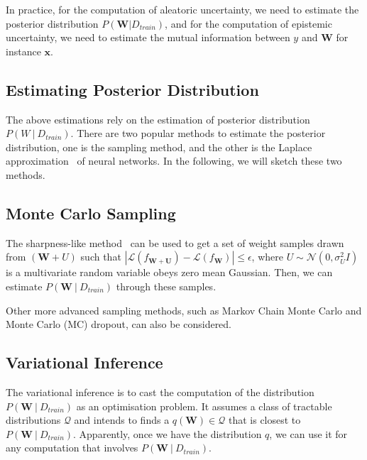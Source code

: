 In practice, for the computation of aleatoric uncertainty, we need to estimate the posterior distribution $P(\textbf{W}|D_{train})$, and for the computation of epistemic uncertainty, we need to estimate the mutual information between $y$ and $\textbf{W}$ for instance $\textbf{x}$. 

\subsection{Estimating Posterior Distribution}\label{sec:estimationgposteirordistribution}

The above estimations rely on the estimation of posterior distribution $P(W~|~D_{train})$. There are two popular methods to estimate the posterior distribution, one is the sampling method, and the other is the Laplace approximation~\cite{botev2017practical,ritter2018scalable} of neural networks. In the following, we will sketch these two methods.   





\subsection*{Monte Carlo Sampling}

The sharpness-like method~\cite{jiang2019fantastic,keskar2016large} can be used to get a set of weight samples drawn from $(\mathbf{W}+U)$ such that $|\mathcal{L}(f_{\mathbf{W}+\mathbf{U}})-\mathcal{L}(f_{\mathbf{W}})|\le \epsilon$, where $U \sim \mathcal{N}(0, \sigma_U^2 I)$ is a multivariate random variable obeys zero mean Gaussian.
Then, we can estimate $P(\textbf{W}~|~D_{train})$ through these samples.   

Other more advanced sampling methods, such as Markov Chain Monte Carlo and Monte Carlo (MC) dropout, can also be considered. 


\subsection*{Variational Inference}\label{sec:VIestimation}

The variational inference is to cast the computation of the distribution $P(\textbf{W}~|~D_{train})$ as an optimisation problem. It assumes a class of tractable distributions $\mathcal{Q}$ and intends to finds a $q(\textbf{W})\in \mathcal{Q}$ that is closest to $P(\textbf{W}~|~D_{train})$. Apparently, once we have the distribution $q$, we can use it for any computation that involves $P(\textbf{W}~|~D_{train})$. 

